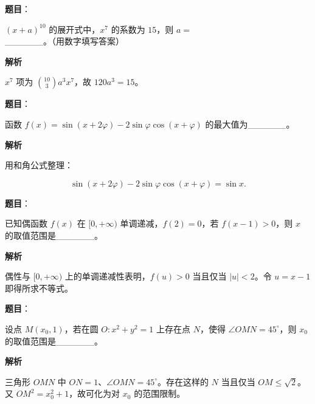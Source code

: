 \begin{answer}

\textbf{题目}：

$(x+a)^{10}$ 的展开式中，$x^7$ 的系数为 $15$，则 $a=$______。（用数字填写答案）

\textbf{解析}

$x^7$ 项为 $\binom{10}{3}a^3x^7$，故 $120a^3=15$。


\end{answer}
\begin{answer}

\textbf{题目}：

函数 $f(x)=\sin(x+2\varphi)-2\sin\varphi\cos(x+\varphi)$ 的最大值为______。

\textbf{解析}

用和角公式整理：

\nopagebreak[4]
\[
\sin(x+2\varphi)-2\sin\varphi\cos(x+\varphi)=\sin x.
\]


\end{answer}
\begin{answer}

\textbf{题目}：

已知偶函数 $f(x)$ 在 $[0,+\infty)$ 单调递减，$f(2)=0$，若 $f(x-1)>0$，则 $x$ 的取值范围是______。

\textbf{解析}

偶性与 $[0,+\infty)$ 上的单调递减性表明，$f(u)>0$ 当且仅当 $|u|<2$。令 $u=x-1$ 即得所求不等式。


\end{answer}
\begin{answer}

\textbf{题目}：

设点 $M(x_0,1)$，若在圆 $O:x^2+y^2=1$ 上存在点 $N$，使得 $\angle OMN=45^\circ$，则 $x_0$ 的取值范围是______。

\textbf{解析}

三角形 $OMN$ 中 $ON=1$、$\angle OMN=45^\circ$。存在这样的 $N$ 当且仅当 $OM\leqslant\sqrt2$。又 $OM^2=x_0^2+1$，故可化为对 $x_0$ 的范围限制。


\end{answer}

